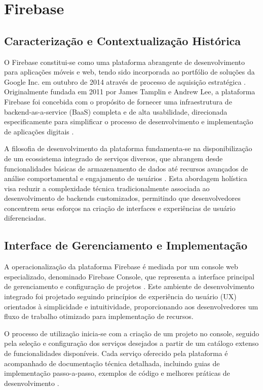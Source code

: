 \section{Firebase}
\subsection{Caracterização e Contextualização Histórica}

O Firebase constitui-se como uma plataforma abrangente de desenvolvimento para aplicações móveis e web, tendo sido incorporada ao portfólio de soluções da Google Inc. em outubro de 2014 através de processo de aquisição estratégica \cite{google2014firebase}. Originalmente fundada em 2011 por James Tamplin e Andrew Lee, a plataforma Firebase foi concebida com o propósito de fornecer uma infraestrutura de backend-as-a-service (BaaS) completa e de alta usabilidade, direcionada especificamente para simplificar o processo de desenvolvimento e implementação de aplicações digitais \cite{tamplin2021firebase}.

A filosofia de desenvolvimento da plataforma fundamenta-se na disponibilização de um ecossistema integrado de serviços diversos, que abrangem desde funcionalidades básicas de armazenamento de dados até recursos avançados de análise comportamental e engajamento de usuários \cite{firebase2023docs}. Esta abordagem holística visa reduzir a complexidade técnica tradicionalmente associada ao desenvolvimento de backends customizados, permitindo que desenvolvedores concentrem seus esforços na criação de interfaces e experiências de usuário diferenciadas.

\subsection{Interface de Gerenciamento e Implementação}

A operacionalização da plataforma Firebase é mediada por um console web especializado, denominado Firebase Console, que representa a interface principal de gerenciamento e configuração de projetos \cite{google2023console}. Este ambiente de desenvolvimento integrado foi projetado seguindo princípios de experiência do usuário (UX) orientados à simplicidade e intuitividade, proporcionando aos desenvolvedores um fluxo de trabalho otimizado para implementação de recursos.

O processo de utilização inicia-se com a criação de um projeto no console, seguido pela seleção e configuração dos serviços desejados a partir de um catálogo extenso de funcionalidades disponíveis. Cada serviço oferecido pela plataforma é acompanhado de documentação técnica detalhada, incluindo guias de implementação passo-a-passo, exemplos de código e melhores práticas de desenvolvimento \cite{firebase2023implementation}.


